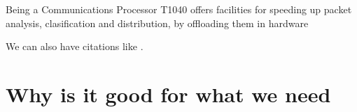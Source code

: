 Being a Communications Processor T1040 offers facilities for speeding up packet
analysis, clasification and distribution, by offloading them in hardware



We can also have citations like \cite{iso-odf}.

\section{Why is it good for what we need}


